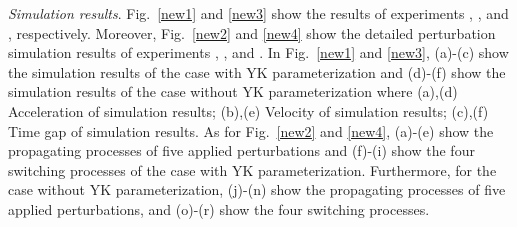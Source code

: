 \documentclass[journal]{IEEEtran}
\begin{document}



\textit{Simulation results}. Fig.~\ref{new1} and \ref{new3} show the results of experiments \uppercase\expandafter{}, \uppercase\expandafter{}, \uppercase\expandafter{} and \uppercase\expandafter{}, respectively. Moreover, Fig.~\ref{new2} and \ref{new4} show the detailed perturbation simulation results of experiments \uppercase\expandafter{}, \uppercase\expandafter{}, \uppercase\expandafter{} and \uppercase\expandafter{}. In Fig.~\ref{new1} and \ref{new3}, (a)-(c) show the simulation results of the case with YK parameterization and (d)-(f) show the simulation results of the case without YK parameterization where (a),(d) Acceleration of simulation results; (b),(e) Velocity of simulation results; (c),(f) Time gap of simulation results. As for Fig.~\ref{new2} and \ref{new4}, (a)-(e) show the propagating processes of five applied perturbations and (f)-(i) show the four switching processes of the case with YK parameterization. Furthermore, for the case without YK parameterization, (j)-(n) show the propagating processes of five applied perturbations, and (o)-(r) show the four switching processes.
\end{document}
